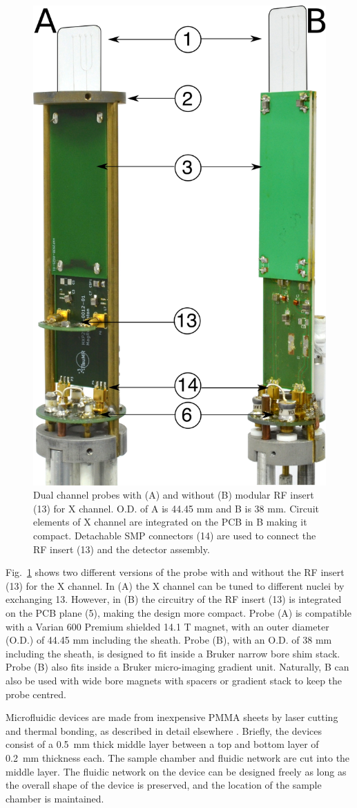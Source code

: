 \documentclass[preprint,5p]{elsarticle}
\newcommand{\fig}[1]{Fig.~\ref{#1}}
\begin{document}
\begin{figure}
\centering
\includegraphics[width=.5\linewidth,keepaspectratio=true]{./figures/ms5n17-tlp-im-181007-both-detectors.png}
\caption{Dual channel probes with (A) and without (B) modular RF insert (13) for X channel. 
O.D. of A is 44.45 mm and B is 38 mm. Circuit elements of X channel are integrated on the 
PCB in B making it compact. Detachable SMP connectors (14) are used to 
connect the RF insert (13) and the detector assembly.}
\label{fig:ProbePhoto}
\end{figure}
\fig{fig:ProbePhoto} shows two different versions of the probe with and without the RF insert (13) 
for the X channel. In (A) the X channel can be tuned to different nuclei by exchanging 13. 
However, in (B) the circuitry of the RF insert (13) is integrated on the PCB plane (5), 
making the design more compact.
 Probe (A) is compatible with a Varian 600 Premium shielded 14.1 T magnet, with an outer diameter (O.D.) of 44.45 mm including the sheath. Probe (B), with an
O.D. of 38 mm including the sheath, is designed to fit inside a
Bruker narrow bore shim stack.
Probe (B) also fits inside a Bruker micro-imaging gradient unit. Naturally, B can also be used with
wide bore magnets with spacers or gradient stack to keep the probe centred.

Microfluidic devices are made from inexpensive PMMA sheets by laser cutting and
thermal bonding, as described in detail elsewhere \cite{yilmaz_bonding}.
Briefly, the devices consist of a 0.5~mm thick middle layer between a  top and
bottom layer of 0.2~mm thickness each. The sample chamber and fluidic network
are cut into the middle layer. The fluidic network on the device can be designed
freely as long as the overall shape of the device is preserved, and the location
of the sample chamber is maintained.
\end{document}
